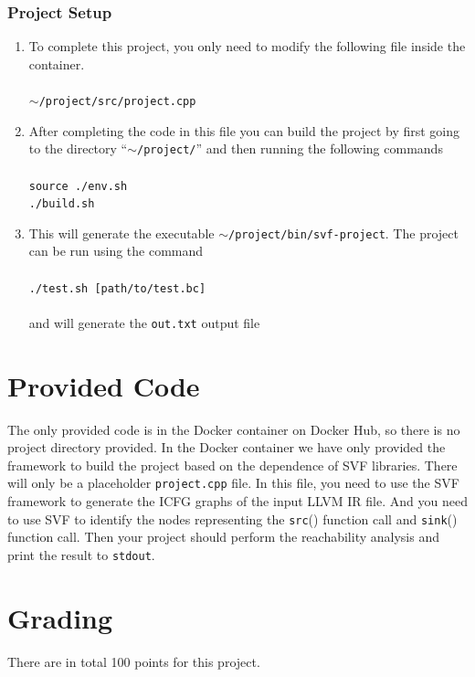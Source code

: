 \documentclass[12pt]{article}
\newcommand{\codeIn}[1]{{\small\tt{#1}}}
\newcommand{\implementationFile}{\codeIn{project.cpp} }
\newcommand{\src}{\codeIn{src}}
\newcommand{\sink}{\codeIn{sink}}
\begin{document}
\subsubsection{Project Setup}
\begin{enumerate}
    \item To complete this project, you only need to modify the following file inside the container.\\\\
    \codeIn{$\sim$/project/src/project.cpp}\\
    
    \item After completing the code in this file you can build the project by first going to the directory ``\codeIn{$\sim$/project/}'' and then running the following commands\\\\
    \codeIn{source ./env.sh}\\
    \codeIn{./build.sh}\\

    \item This will generate the executable \codeIn{$\sim$/project/bin/svf-project}. The project can be run using the command\\\\    
    \codeIn{./test.sh [path/to/test.bc]}\\\\
    and will generate the \codeIn{out.txt} output file
    

\end{enumerate}
\section{Provided Code}

The only provided code is in the Docker container on Docker Hub, so there is no project directory provided. In the Docker container we have only provided the framework to build the project based on
the dependence of SVF libraries. There will only be a
placeholder \implementationFile file. In this file, you need to use the SVF framework to generate the ICFG graphs of
the input LLVM IR file. And you need to use SVF to identify the nodes
representing the \src () function call and \sink () function call.
Then your project should perform the reachability analysis and print the result to \codeIn{stdout}.

\section{Grading}
There are in total 100 points for this project.
\end{document}

